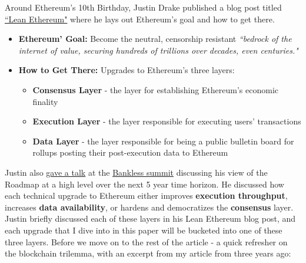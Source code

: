 \documentclass[12pt]{article}
\begin{document}
Around Ethereum's 10th Birthday, Justin Drake published a blog post titled \href{https://blog.ethereum.org/2025/07/31/lean-ethereum}{``Lean Ethereum"} where he lays out Ethereum's goal and how to get there.  

\begin{itemize}
    \item \textbf{Ethereum' Goal:} Become the neutral, censorship resistant \textit{``bedrock of the internet of value, securing hundreds of trillions over decades, even centuries."}
    \item \textbf{How to Get There:} Upgrades to Ethereum's three layers:
    \begin{itemize}
        \item \textbf{Consensus Layer} - the layer for establishing Ethereum's economic finality
        \item \textbf{Execution Layer} - the layer responsible for executing users' transactions
        \item \textbf{Data Layer} - the layer responsible for being a public bulletin board for rollups posting their post-execution data to Ethereum
    \end{itemize}
\end{itemize}

 Justin also \href{https://www.youtube.com/watch?v=8mJDt8TGebc}{gave a talk} at the \href{https://www.youtube.com/watch?v=zeNVsuO_fts&list=PLmkdAgtxf3aidisFxgAfbe7AuMmruh4qE}{Bankless summit} discussing his view of the Roadmap at a high level over the next 5 year time horizon. He discussed how each technical upgrade to Ethereum either improves \textbf{execution throughput}, increases \textbf{data availability}, or hardens and democratizes the \textbf{consensus} layer. Justin briefly discussed each of these layers in his Lean Ethereum blog post, and each upgrade that I dive into in this paper will be bucketed into one of these three layers.
Before we move on to the rest of the article - a quick refresher on the blockchain trilemma, with an excerpt from my article from three years ago: \\
\end{document}
